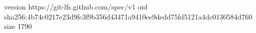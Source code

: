 version https://git-lfs.github.com/spec/v1
oid sha256:4b74c0217e23d9fc3f9b356d43471a9410ee9dedd75fd5121a4dc0130584d760
size 1790
